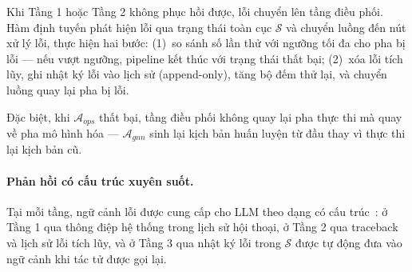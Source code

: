 Khi Tầng 1 hoặc Tầng 2 không phục hồi được, lỗi chuyển lên tầng điều phối. Hàm định tuyến phát hiện lỗi qua trạng thái toàn cục $\mathcal{S}$ và chuyển luồng đến nút xử lý lỗi, thực hiện hai bước: (1)~so sánh số lần thử với ngưỡng tối đa cho pha bị lỗi --- nếu vượt ngưỡng, pipeline kết thúc với trạng thái thất bại; (2)~xóa lỗi tích lũy, ghi nhật ký lỗi vào lịch sử (append-only), tăng bộ đếm thử lại, và chuyển luồng quay lại pha bị lỗi.

Đặc biệt, khi $\mathcal{A}_{ops}$ thất bại, tầng điều phối không quay lại pha thực thi mà quay về pha mô hình hóa --- $\mathcal{A}_{gnn}$ sinh lại kịch bản huấn luyện từ đầu thay vì thực thi lại kịch bản cũ.

\paragraph{Phản hồi có cấu trúc xuyên suốt.}
Tại mỗi tầng, ngữ cảnh lỗi được cung cấp cho LLM theo dạng có cấu trúc~\cite{shinn2023reflexion}: ở Tầng 1 qua thông điệp hệ thống trong lịch sử hội thoại, ở Tầng 2 qua traceback và lịch sử lỗi tích lũy, và ở Tầng 3 qua nhật ký lỗi trong $\mathcal{S}$ được tự động đưa vào ngữ cảnh khi tác tử được gọi lại.
